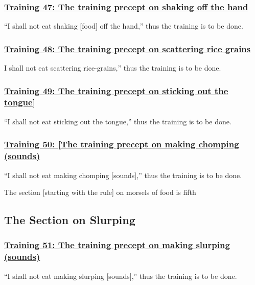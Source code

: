 \subsubsection*{\hyperref[sekh47]{Training 47: The training precept on shaking off the hand}}
\label{training47}
``I shall not eat shaking [food] off the hand,'' thus the training is to be done.

\subsubsection*{\hyperref[sekh48]{Training 48: The training precept on scattering rice grains}}
\label{training48}
I shall not eat scattering rice-grains,'' thus the training is to be done.

\subsubsection*{\hyperref[sekh49]{Training 49: The training precept on sticking out the tongue]}}
\label{training49}
``I shall not eat sticking out the tongue,'' thus the training is to be done.

\subsubsection*{\hyperref[sekh50]{Training 50: [The training precept on making chomping (sounds)}}
\label{training50}
``I shall not eat making chomping [sounds],'' thus the training is to be done.

\begin{center}
  The section [starting with the rule] on morsels of food is fifth
\end{center}

\setsubsecheadstyle{\subsectionFmt}
\subsection{The Section on Slurping}
\vspace{0.2cm}

\subsubsection*{\hyperref[sekh51]{Training 51: The training precept on making slurping (sounds)}}
\label{training51}
``I shall not eat making slurping [sounds],'' thus the training is to be done.

